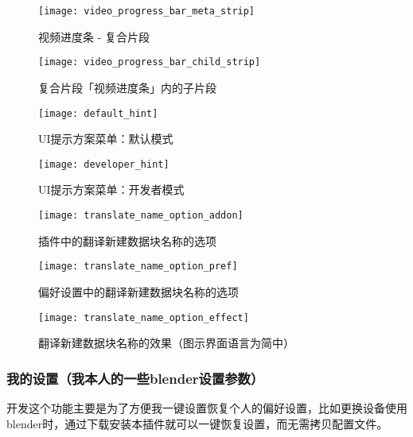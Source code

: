 \documentclass{../../public_resources/doc}
\begin{document}
\begin{figure}[h!]
    \begin{minipage}[t]{0.48\linewidth}
        \texttt{[image: video\_progress\_bar\_meta\_strip]}
        \caption{视频进度条 - 复合片段}
        \label{视频进度条复合片段}
    \end{minipage}
    \quad
    \begin{minipage}[t]{0.48\linewidth}
        \texttt{[image: video\_progress\_bar\_child\_strip]}
        \caption{复合片段「视频进度条」内的子片段}
        \label{视频进度条子片段}
    \end{minipage}

    \vspace{1ex}

    \begin{minipage}[t]{0.48\linewidth}
        \texttt{[image: default\_hint]}
        \caption{UI提示方案菜单：默认模式}
        \label{默认提示方案}
    \end{minipage}
    \quad
    \begin{minipage}[t]{0.48\linewidth}
        \texttt{[image: developer\_hint]}
        \caption{UI提示方案菜单：开发者模式}
        \label{开发者提示方案}
    \end{minipage}

    \vspace{1ex}

    \begin{minipage}[t]{0.45\linewidth}
        \texttt{[image: translate\_name\_option\_addon]}
        \caption{插件中的翻译新建数据块名称的选项}
        \label{插件的翻译名称选项}
    \end{minipage}
    \quad
    \begin{minipage}[t]{0.5\linewidth}
        \texttt{[image: translate\_name\_option\_pref]}
        \caption{偏好设置中的翻译新建数据块名称的选项}
        \label{偏好设置的的翻译名称选项}
    \end{minipage}
\end{figure}

\clearpage

\begin{figure}
    \texttt{[image: translate\_name\_option\_effect]}
    \caption{翻译新建数据块名称的效果（图示界面语言为简中）}
    \label{翻译名称的效果}
\end{figure}

\subsubsection{我的设置（我本人的一些blender设置参数）}
\hypertarget{MySettings}{}
开发这个功能主要是为了方便我一键设置恢复个人的偏好设置，比如更换设备使用blender时，通过下载安装本插件就可以一键恢复设置，而无需拷贝配置文件。
\end{document}
